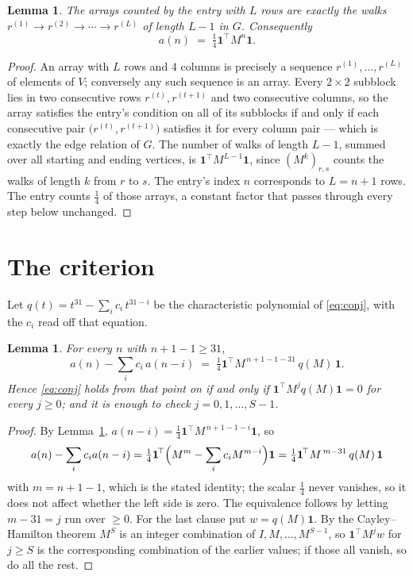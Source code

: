 \documentclass[11pt,a4paper]{article}
\theoremstyle{plain}
\newtheorem{lemma}[theorem]{Lemma}
\theoremstyle{definition}
\begin{document}
\begin{lemma}\label{lem:walk}
The arrays counted by the entry with $L$ rows are exactly the walks
$r^{(1)}\to r^{(2)}\to\cdots\to r^{(L)}$ of length $L-1$ in $G$. Consequently
\[
a(n)\;=\;\tfrac1{4}\mathbf{1}^{\!\top}M^{n}\mathbf{1} .
\]
\end{lemma}

\begin{proof}
An array with $L$ rows and $4$ columns is precisely a sequence
$r^{(1)},\dots,r^{(L)}$ of elements of $V$; conversely any such sequence is an array.
Every $2\times2$ subblock lies in two consecutive rows $r^{(t)},r^{(t+1)}$ and two
consecutive columns, so the array satisfies the entry's condition on all of its subblocks
if and only if each consecutive pair $\bigl(r^{(t)},r^{(t+1)}\bigr)$ satisfies it for
every column pair --- which is exactly the edge relation of $G$. The number of walks of
length $L-1$, summed over all starting and ending vertices, is
$\mathbf{1}^{\!\top}M^{L-1}\mathbf{1}$, since $(M^{k})_{r,s}$ counts the walks of
length $k$ from $r$ to $s$. The entry's index $n$ corresponds to $L=n+1$ rows. The entry counts $\tfrac1{4}$ of those arrays, a constant factor that passes through every step below unchanged.
\end{proof}

\section{The criterion}

Let $q(t)=t^{31}-\sum_i c_i\,t^{31-i}$ be the characteristic polynomial of
\eqref{eq:conj}, with the $c_i$ read off that equation.

\begin{lemma}\label{lem:crit}
For every $n$ with $n+1-1\ge31$,
\[
a(n)-\sum_i c_i\,a(n-i)\;=\;\tfrac1{4}\mathbf{1}^{\!\top}M^{\,n+1-1-31}\,q(M)\,\mathbf{1} .
\]
Hence \eqref{eq:conj} holds from that point on if and only if
$\mathbf{1}^{\!\top}M^{j}q(M)\mathbf{1}=0$ for every $j\ge0$; and it is enough to check
$j=0,1,\dots,S-1$.
\end{lemma}

\begin{proof}
By Lemma~\ref{lem:walk}, $a(n-i)=\tfrac1{4}\mathbf{1}^{\!\top}M^{\,n+1-1-i}\mathbf{1}$, so
\[
a(n)-\sum_i c_i a(n-i)
=\tfrac1{4}\mathbf{1}^{\!\top}\Bigl(M^{m}-\sum_i c_i M^{m-i}\Bigr)\mathbf{1}
=\tfrac1{4}\mathbf{1}^{\!\top}M^{\,m-31}\,q(M)\,\mathbf{1}
\]
with $m=n+1-1$, which is the stated identity; the scalar $\tfrac1{4}$ never vanishes, so
it does not affect whether the left side is zero. The equivalence follows by letting
$m-31=j$ run over $\ge0$. For the last clause put $w=q(M)\mathbf{1}$. By the
Cayley--Hamilton theorem $M^{S}$ is an integer combination of $I,M,\dots,M^{S-1}$, so
$\mathbf{1}^{\!\top}M^{j}w$ for $j\ge S$ is the corresponding combination of the earlier
values; if those all vanish, so do all the rest.
\end{proof}
\end{document}
